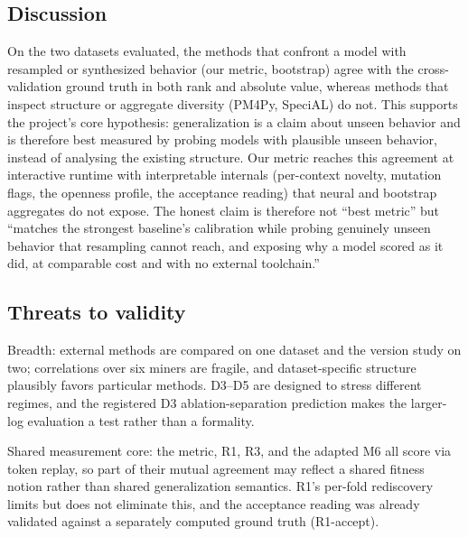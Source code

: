 \documentclass[runningheads]{llncs}
\begin{document}
\subsection{Discussion}
\label{sec:eval:discussion}
On the two datasets evaluated, the methods that confront a model with resampled or synthesized behavior (our metric, bootstrap) agree with the cross-validation ground truth in both rank and absolute value, whereas methods that inspect structure or aggregate diversity (PM4Py, SpeciAL) do not. This supports the project's core hypothesis: generalization is a claim about unseen behavior and is therefore best measured by probing models with plausible unseen behavior, instead of analysing the existing structure. Our metric reaches this agreement at interactive runtime with interpretable internals (per-context novelty, mutation flags, the openness profile, the acceptance reading) that neural and bootstrap aggregates do not expose. The honest claim is therefore not ``best metric'' but ``matches the strongest baseline's calibration while probing genuinely unseen behavior that resampling cannot reach, and exposing why a model scored as it did, at comparable cost and with no external toolchain.''

\subsection{Threats to validity}
\label{sec:eval:threats}
Breadth: external methods are compared on one dataset and the version study on two; correlations over six miners are fragile, and dataset-specific structure plausibly favors particular methods. D3--D5 are designed to stress different regimes, and the registered D3 ablation-separation prediction makes the larger-log evaluation a test rather than a formality.

Shared measurement core: the metric, R1, R3, and the adapted M6 all score via token replay, so part of their mutual agreement may reflect a shared fitness notion rather than shared generalization semantics. R1's per-fold rediscovery limits but does not eliminate this, and the acceptance reading was already validated against a separately computed ground truth (R1-accept).
\end{document}

